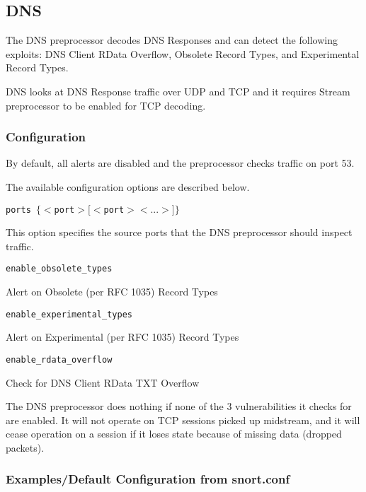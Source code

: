 \documentclass[english]{report}
\newcounter{slistnum}
\newenvironment{slist}
{ \begin{list}{ {\bf \arabic{slistnum}.} }{\usecounter{slistnum} } }
{ \end{list} }
\begin{document}
\subsection{DNS}
\label{sub:dns}

The DNS preprocessor decodes DNS Responses and can detect the following
exploits: DNS Client RData Overflow, Obsolete Record Types, and Experimental
Record Types.

DNS looks at DNS Response traffic over UDP and TCP and it requires Stream
preprocessor to be enabled for TCP decoding.

\subsubsection{Configuration}

By default, all alerts are disabled and the preprocessor checks traffic on port
53.

The available configuration options are described below.

\begin{slist}

\item \texttt{ports $\{ <$port$> [<$port$> <...>] \}$}

This option specifies the source ports that the DNS preprocessor should inspect
traffic.

\item \texttt{enable\_obsolete\_types}

Alert on Obsolete (per RFC 1035) Record Types

\item \texttt{enable\_experimental\_types}

Alert on Experimental (per RFC 1035) Record Types

\item \texttt{enable\_rdata\_overflow}

Check for DNS Client RData TXT Overflow

\end{slist}

The DNS preprocessor does nothing if none of the 3 vulnerabilities it checks
for are enabled.  It will not operate on TCP sessions picked up midstream, and
it will cease operation on a session if it loses state because of missing data
(dropped packets).

\subsubsection{Examples/Default Configuration from snort.conf}
\end{document}
